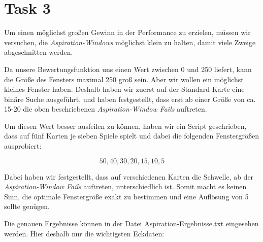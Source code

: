 \section{Task 3}
Um einen möglichst großen Gewinn in der Performance zu erzielen, müssen wir versuchen, die \textit{Aspiration-Windows} möglichst klein zu halten, damit viele Zweige abgeschnitten werden.

Da unsere Bewertungsfunktion uns einen Wert zwischen 0 und 250 liefert, kann die Größe des Fensters maximal 250 groß sein. Aber wir wollen ein möglichst kleines Fenster haben. Deshalb haben wir zuerst auf der Standard Karte eine binäre Suche ausgeführt, und haben festgestellt, dass erst ab einer Größe von ca. 15-20 die oben beschriebenen \textit{Aspiration-Window Fails} auftreten.

Um diesen Wert besser ausfeilen zu können, haben wir ein Script geschrieben, dass auf fünf Karten je sieben Spiele spielt und dabei die folgenden Fenstergrößen ausprobiert:

$$ 50, 40, 30, 20, 15, 10, 5$$

Dabei haben wir festgestellt, dass auf verschiedenen Karten die Schwelle, ab der \textit{Aspiration-Window Fails} auftreten, unterschiedlich ist. Somit macht es keinen  Sinn, die optimale Fenstergröße exakt zu bestimmen und eine Auflösung von 5 sollte genügen.

Die genauen Ergebnisse können in der Datei Aspiration-Ergebnisse.txt eingesehen werden.
Hier deshalb nur die wichtigsten Eckdaten:

